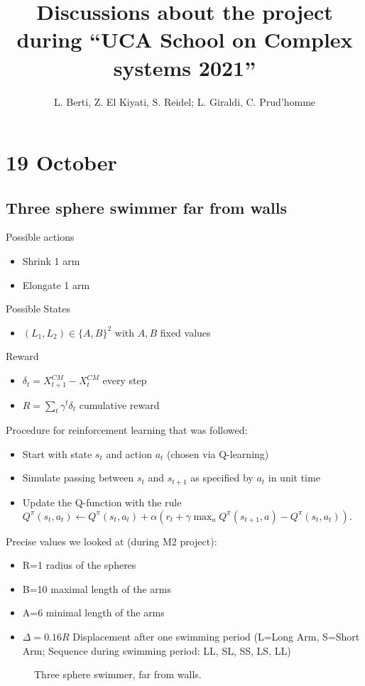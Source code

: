 \documentclass{article}
\title{Discussions about the project during ``UCA School on Complex systems 2021''}
\author{L. Berti, Z. El Kiyati, S. Reidel; L. Giraldi, C. Prud'homme}
\begin{document}
	\maketitle
	\section{19 October}
	\subsection{Three sphere swimmer far from walls}
	Possible actions
	\begin{itemize}
		\item Shrink 1 arm
		\item Elongate 1 arm
	\end{itemize}
	Possible States
	\begin{itemize}
		\item $(L_1,L_2) \in \{A,B\}^2$ with $A, B$ fixed values
	\end{itemize}
	Reward
	\begin{itemize}
		\item $\delta_t = X^{CM}_{t+1}-X_t^{CM}$ every step
		\item $R = \sum_t \gamma^t\delta_t$ cumulative reward
	\end{itemize}
	Procedure for reinforcement learning that was followed:
	\begin{itemize}
		\item Start with state $s_t$ and action $a_t$ (chosen via Q-learning)
		\item Simulate passing between $s_t$ and $s_{t+1}$ as specified by $a_t$ in unit time
		\item Update the Q-function with the rule $Q^\pi(s_t,a_t) \leftarrow Q^\pi(s_t,a_t) + \alpha(r_t + \gamma \max_a Q^\pi(s_{t+1},a)-Q^\pi(s_{t},a_{t})).$
	\end{itemize}
	Precise values we looked at (during M2 project): 
	\begin{itemize}
		\item R=1 radius of the spheres
		\item B=10 maximal length of the arms
		\item A=6 minimal length of the arms
		\item $\Delta=0.16R$ Displacement after one swimming period (L=Long Arm, S=Short Arm; Sequence during swimming period: LL, SL, SS, LS, LL)
	\end{itemize}
\begin{figure}
	\centering
\caption{Three sphere swimmer, far from walls.}
\end{figure}
\end{document}
